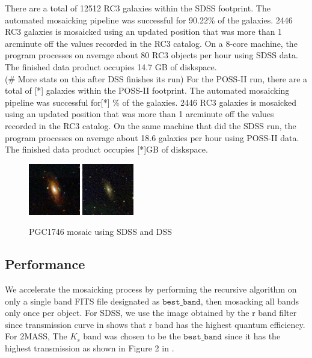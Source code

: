 \documentclass[authoryear, 12pt,5p, times]{elsarticle}
\begin{document}
\indent There are a total of 12512 RC3 galaxies within the SDSS footprint. The automated mosaicking pipeline was  successful for 90.22\% of the galaxies. 2446 RC3 galaxies is mosaicked using an updated position that was more than 1 arcminute off the values recorded in the RC3 catalog.  On a 8-core machine, the program processes on average about 80 RC3 objects per hour using SDSS data.  The finished data product occupies 14.7 GB of diskspace. 
\\
\indent  (\# More stats on this after DSS finishes its run) 
 For the POSS-II run, there are a total of [*] galaxies within the POSS-II footprint.
 The automated mosaicking pipeline was  successful for[*] \% of the galaxies. 2446 RC3 galaxies is mosaicked using an updated position that was more than 1 arcminute off the values recorded in the RC3 catalog. On the same machine that did the SDSS run, the program processes on average about 18.6 galaxies per hour using POSS-II data.  The finished data product occupies [*]GB of diskspace. 
\begin{figure}[h]
 \centering
	\includegraphics[width=0.2\textwidth]{figures/SDSS_1154_BEST}
	\includegraphics[width=0.2\textwidth]{figures/DSS_1154_BEST}	
	\caption{PGC1746 mosaic using SDSS and DSS}
	\label{sdss_dss_comp}
\end{figure}

\subsection{Performance}	

We accelerate the mosaicking process by performing the recursive algorithm on only a single band FITS file designated as $\texttt{best\_band}$, then mosacking all bands only once per object. For SDSS, we use the image obtained by the r band filter since transmission curve in \citealp{edr} shows that r band has the highest quantum efficiency. For 2MASS, The $K_s$ band was chosen to be the $\texttt{best\_band}$ since it has the highest transmission as shown  in Figure 2 in \citealp{2mass}.
\end{document}
